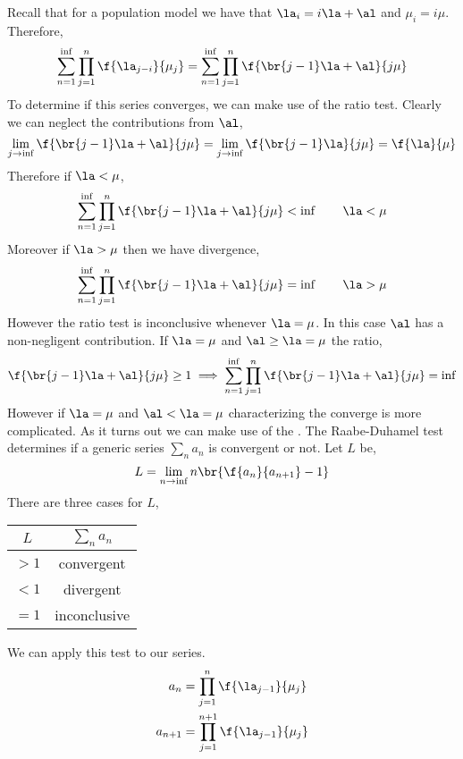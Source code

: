 \documentclass{article}
\begin{document}
    \begin{example}
         Recall that for a population model we have that $\la_i = i \la + \al$ and $\mu_i = i \mu$. Therefore,
        \begin{align*}
            \sum_{n = 1}^{\inf} \prod_{j=1}^{n} \f{\la_{j-i}}{\mu_j} = \sum_{n = 1}^{\inf} \prod_{j=1}^{n} \f{\br{j-1}\la + \al}{j \mu}
        \end{align*}
        To determine if this series converges, we can make use of the ratio test. Clearly we can neglect the contributions from $\al$,
        \[ \lim_{j \to \inf} \f{\br{j-1}\la + \al}{j \mu} = \lim_{j \to \inf} \f{\br{j-1}\la}{j \mu} = \f{\la}{\mu}  \]
        Therefore if $\la < \mu$,
        \[ \sum_{n = 1}^{\inf} \prod_{j=1}^{n} \f{\br{j-1}\la + \al}{j \mu} < \inf \qquad \la < \mu\]
        Moreover if $\la > \mu$ then we have divergence,
        \[ \sum_{n = 1}^{\inf} \prod_{j=1}^{n} \f{\br{j-1}\la + \al}{j \mu} = \inf \qquad \la > \mu\]
        However the ratio test is inconclusive whenever $\la = \mu$. In this case $\al$ has a non-negligent contribution. If $\la = \mu$ and $\al \geq \la = \mu$ the ratio,
        \[ \f{\br{j-1}\la + \al}{j \mu} \geq 1 \implies \sum_{n = 1}^{\inf} \prod_{j=1}^{n} \f{\br{j-1}\la + \al}{j \mu} = \inf \]
        However if $\la = \mu$ and $\al < \la = \mu$ characterizing the converge is more complicated. As it turns out we can make use of the . The Raabe-Duhamel test determines if a generic series $\sum_n{a_n}$ is convergent or not. Let $L$ be,
        \[ L = \lim_{n \to \inf} n \br{\f{a_n}{a_{n+1}} - 1} \]
        There are three cases for $L$,
        \begin{center}
            \begin{tabular}{|c|c|}
            \hline
            $L$ & $\sum_{n} a_n$ \\
            \hline
            $>1$ & convergent \\
            $<1$ & divergent \\
            $=1$ & inconclusive \\
            \hline
            \end{tabular}
        \end{center}
        We can apply this test to our series.
        \begin{align*}
        a_n &= \prod_{j=1}^{n} \f{\la_{j-1}}{\mu_j} \\
        a_{n+1} &= \prod_{j=1}^{n+1} \f{\la_{j-1}}{\mu_j} \\

\end{align*}
\end{example}
\end{document}
